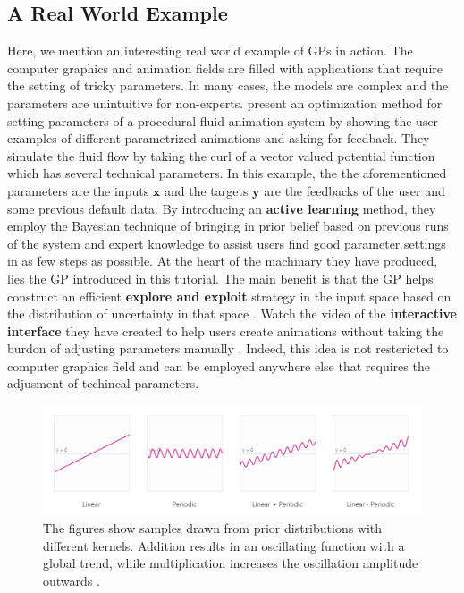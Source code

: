 \documentclass[10pt]{article}
\theoremstyle{definition}
\begin{document}
\subsection{A Real World Example}
Here, we mention an interesting real world example of GPs in action. The computer graphics and animation fields are filled with applications that require the setting of tricky parameters. In many cases, the models are complex and the parameters are unintuitive for non-experts. \citeauthor{Brochu2010} \cite{Brochu2010} present an optimization method for setting parameters of a procedural fluid animation system by showing the user examples of different parametrized animations and asking for feedback. They simulate the fluid flow by taking the curl of a vector valued potential function which has several technical parameters. In this example, the the aforementioned parameters are the inputs $\mathbf{x}$ and the targets $\mathbf{y}$ are the feedbacks of the user and some previous default data. By introducing an \textbf{active learning} method, they employ the Bayesian technique of bringing in prior belief based on previous runs of the system and expert knowledge to assist users find good parameter settings in as few steps as possible. At the heart of the machinary they have produced, lies the GP introduced in this tutorial. The main benefit is that the GP helps construct an efficient \textbf{explore and exploit} strategy in the input space based on the distribution of uncertainty in that space \cite[Lecture 9]{Freitas2013}. Watch the video of the \textbf{interactive interface} they have created to help users create animations without taking the burdon of adjusting parameters manually \cite{Brochu2010Animation}. Indeed, this idea is not restericted to computer graphics field and can be employed anywhere else that requires the adjusment of techincal parameters.
\begin{figure}[t!]
\centering
\includegraphics[width=17cm]{figs/combine-kernels.png}
\caption{The figures show samples drawn from prior distributions with different kernels. Addition results in an oscillating function with a global trend, while multiplication increases the oscillation amplitude outwards \cite{Gortler2019}.}
\label{fig:kernels:combine}
\end{figure}
\end{document}

